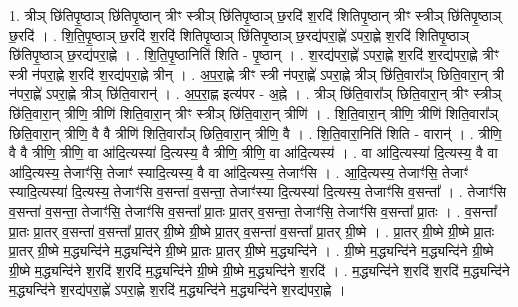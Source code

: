 \documentclass[17pt]{extarticle}
\begin{document}
1. त्रीञ् छि॑तिपृ॒ष्ठाञ् छि॑तिपृ॒ष्ठान् त्रीꣳ स्त्रीञ् छि॑तिपृ॒ष्ठाञ् छ॒रदि॑ श॒रदि॑ शितिपृ॒ष्ठान् त्रीꣳ स्त्रीञ् छि॑तिपृ॒ष्ठाञ् छ॒रदि॑ । . शि॒ति॒पृ॒ष्ठाञ् छ॒रदि॑ श॒रदि॑ शितिपृ॒ष्ठाञ् छि॑तिपृ॒ष्ठाञ् छ॒रद्य॑परा॒ह्णे॑ ऽपरा॒ह्णे श॒रदि॑ शितिपृ॒ष्ठाञ् छि॑तिपृ॒ष्ठाञ् छ॒रद्य॑परा॒ह्णे । . शि॒ति॒पृ॒ष्ठानिति॑ शिति - पृ॒ष्ठान् । . श॒रद्य॑परा॒ह्णे॑ ऽपरा॒ह्णे श॒रदि॑ श॒रद्य॑परा॒ह्णे त्रीꣳ स्त्री न॑परा॒ह्णे श॒रदि॑ श॒रद्य॑परा॒ह्णे त्रीन् । . अ॒प॒रा॒ह्णे त्रीꣳ स्त्री न॑परा॒ह्णे॑ ऽपरा॒ह्णे त्रीञ् छि॑ति॒वारा᳚ञ् छिति॒वारा॒न् त्री न॑परा॒ह्णे॑ ऽपरा॒ह्णे त्रीञ् छि॑ति॒वारान्॑ । . अ॒प॒रा॒ह्ण इत्य॑पर - अ॒ह्ने । . त्रीञ् छि॑ति॒वारा᳚ञ् छिति॒वारा॒न् त्रीꣳ स्त्रीञ् छि॑ति॒वारा॒न् त्रीणि॒ त्रीणि॑ शिति॒वारा॒न् त्रीꣳ स्त्रीञ् छि॑ति॒वारा॒न् त्रीणि॑ । . शि॒ति॒वारा॒न् त्रीणि॒ त्रीणि॑ शिति॒वारा᳚ञ् छिति॒वारा॒न् त्रीणि॒ वै वै त्रीणि॑ शिति॒वारा᳚ञ् छिति॒वारा॒न् त्रीणि॒ वै । . शि॒ति॒वारा॒निति॑ शिति - वारान्॑ । . त्रीणि॒ वै वै त्रीणि॒ त्रीणि॒ वा आ॑दि॒त्यस्या॑ दि॒त्यस्य॒ वै त्रीणि॒ त्रीणि॒ वा आ॑दि॒त्यस्य॑ । . वा आ॑दि॒त्यस्या॑ दि॒त्यस्य॒ वै वा आ॑दि॒त्यस्य॒ तेजाꣳ॑सि॒ तेजाꣳ॑ स्यादि॒त्यस्य॒ वै वा आ॑दि॒त्यस्य॒ तेजाꣳ॑सि । . आ॒दि॒त्यस्य॒ तेजाꣳ॑सि॒ तेजाꣳ॑ स्यादि॒त्यस्या॑ दि॒त्यस्य॒ तेजाꣳ॑सि व॒सन्ता॑ व॒सन्ता॒ तेजाꣳ॑स्या दि॒त्यस्या॑ दि॒त्यस्य॒ तेजाꣳ॑सि व॒सन्ता᳚ । . तेजाꣳ॑सि व॒सन्ता॑ व॒सन्ता॒ तेजाꣳ॑सि॒ तेजाꣳ॑सि व॒सन्ता᳚ प्रा॒तः प्रा॒तर् व॒सन्ता॒ तेजाꣳ॑सि॒ तेजाꣳ॑सि व॒सन्ता᳚ प्रा॒तः । . व॒सन्ता᳚ प्रा॒तः प्रा॒तर् व॒सन्ता॑ व॒सन्ता᳚ प्रा॒तर् ग्री॒ष्मे ग्री॒ष्मे प्रा॒तर् व॒सन्ता॑ व॒सन्ता᳚ प्रा॒तर् ग्री॒ष्मे । . प्रा॒तर् ग्री॒ष्मे ग्री॒ष्मे प्रा॒तः प्रा॒तर् ग्री॒ष्मे म॒द्ध्यन्दि॑ने म॒द्ध्यन्दि॑ने ग्री॒ष्मे प्रा॒तः प्रा॒तर् ग्री॒ष्मे म॒द्ध्यन्दि॑ने । . ग्री॒ष्मे म॒द्ध्यन्दि॑ने म॒द्ध्यन्दि॑ने ग्री॒ष्मे ग्री॒ष्मे म॒द्ध्यन्दि॑ने श॒रदि॑ श॒रदि॑ म॒द्ध्यन्दि॑ने ग्री॒ष्मे ग्री॒ष्मे म॒द्ध्यन्दि॑ने श॒रदि॑ । . म॒द्ध्यन्दि॑ने श॒रदि॑ श॒रदि॑ म॒द्ध्यन्दि॑ने म॒द्ध्यन्दि॑ने श॒रद्य॑परा॒ह्णे॑ ऽपरा॒ह्णे श॒रदि॑ म॒द्ध्यन्दि॑ने म॒द्ध्यन्दि॑ने श॒रद्य॑परा॒ह्णे । \newline
\end{document}
